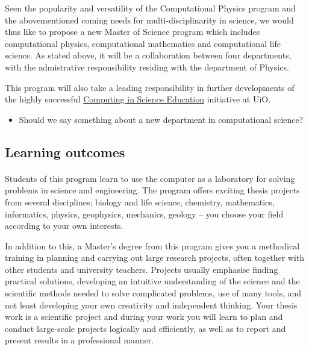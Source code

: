 \documentclass[%
twoside,                 %
final,                   %
10pt]{article}
\begin{document}
Seen the popularity and versatility of the Computational Physics program and the abovementioned coming needs for multi-disciplinarity in science, we would thus like to propose a new Master of Science program which includes computational physics, computational mathematics and computational life science. As stated above, it will be a collaboration between four departments, with the admistrative responsibility residing with the department of Physics. 

This program will also take a leading responsibility in further
developments of the highly successful \href{{http://www.mn.uio.no/english/about/collaboration/cse/}}{Computing in Science Education} initiative at UiO. 

\begin{itemize}
\item Should we say something about a new department in computational science?
\end{itemize}

\noindent








\subsection*{Learning outcomes}

\paragraph{}

Students of this program learn to use the computer as a laboratory for solving problems in science and engineering. The program offers exciting thesis projects from several disciplines; biology and life science, chemistry, mathematics, informatics, physics, geophysics, mechanics, geology  – you choose your  field according to your own interests.

In addition to this, a Master’s degree from this program gives you a
methodical training in planning and carrying out large research
projects, often together with other students and university
teachers. Projects usually emphasise finding practical solutions,
developing an intuitive understanding of the science and the
scientific methods needed to solve complicated problems, use of many
tools, and not least developing your own creativity and independent
thinking. Your thesis work is a scientific  project and during your work you will
learn to plan and conduct large-scale projects logically and efficiently, as well as
to report and present results in a professional manner.
\end{document}
